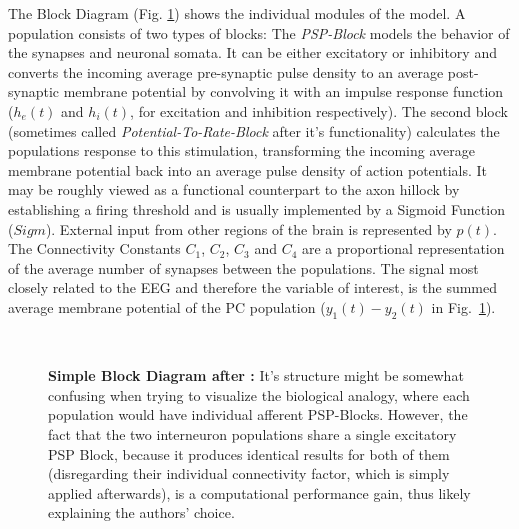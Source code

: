 The Block Diagram (Fig. \ref{fig:Jansen Rit Simple}) shows the individual modules of the model.
A population consists of two types of blocks:
The \textit{PSP-Block} models the behavior of the synapses and neuronal somata.
It can be either excitatory or inhibitory and converts the incoming average pre-synaptic pulse density to
an average post-synaptic membrane potential by convolving it with an
impulse response function ($h_e(t)$ and $h_i(t)$, for excitation and inhibition respectively).
The second block (sometimes called \textit{Potential-To-Rate-Block} after it's functionality)
calculates the populations response to this stimulation, transforming the incoming
average membrane potential back into an average pulse density of action potentials.
It may be roughly viewed as a functional counterpart to the axon hillock by establishing a firing threshold
and is usually implemented by a Sigmoid Function ($Sigm$).
External input from other regions of the brain is represented by $p(t)$.
The Connectivity Constants $C_1$, $C_2$, $C_3$ and $C_4$ are a proportional representation of the
average number of synapses between the populations.
The signal most closely related to the EEG and therefore the variable of interest,
is the summed average membrane potential of the PC population ($y_1(t)-y_2(t)$ in Fig.~\ref{fig:Jansen Rit Simple}).

\\[1em]

\begin{figure}[H]
    \centering
    
    \caption{\textbf{Simple Block Diagram after \parencite{jansen_electroencephalogram_1995}:} It's structure might be somewhat confusing when trying to visualize the biological analogy, where each population would have individual afferent PSP-Blocks. However, the fact that the two interneuron populations share a single excitatory PSP Block, because it produces identical results for both of them (disregarding their individual connectivity factor, which is simply applied afterwards), is a computational performance gain, thus likely explaining the authors' choice.}
    \label{fig:Jansen Rit Simple}
\end{figure}

